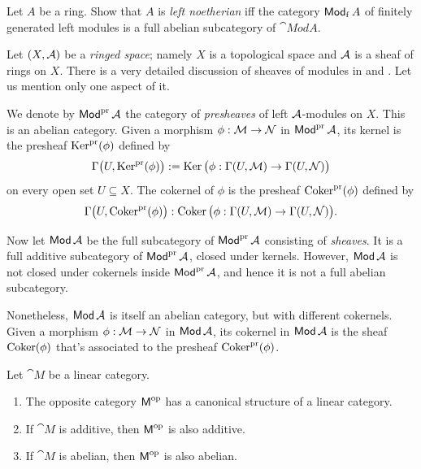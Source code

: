 \begin{exer}
Let $A$ be a ring. Show that $A$ is {\em left noetherian} iff the category 
$\operatorname{\mathsf{Mod}}_{\mathrm{f}} A$ of  finitely generated left modules is a full abelian 
subcategory of $\cat{Mod} A$. 
\end{exer}

\begin{exa} \label{exa:1}
Let $(X, \mathcal{A})$ be a {\em ringed space}; namely $X$ is a topological space 
and $\mathcal{A}$ is a sheaf of rings on $X$. 
There is a very detailed discussion of sheaves of modules in 
\cite[Section II.1]{Har} and \cite[Sections 2.1-2.2]{KaSc1}. 
Let us mention only one aspect of it. 

We denote by $\operatorname{\mathsf{Mod}}^{\mathrm{pr}} \mathcal{A}$ the category of {\em presheaves} 
of left $\mathcal{A}$-modules on $X$. This is an abelian category. 
Given a morphism $\phi : \mathcal{M} \to \mathcal{N}$ in 
$\operatorname{\mathsf{Mod}}^{\mathrm{pr}} \mathcal{A}$, its kernel is the presheaf 
$\operatorname{Ker}^{\mathrm{pr}}(\phi)$ defined by 
\[ \Gamma \bigl( U, \operatorname{Ker}^{\mathrm{pr}}(\phi) \bigr) := 
\operatorname{Ker} \big( \phi : \Gamma(U, \mathcal{M}) \to \Gamma(U, \mathcal{N}) \big)  \]
on every open set $U \subseteq X$. 
The cokernel of $\phi$ is the  presheaf $\operatorname{Coker}^{\mathrm{pr}}(\phi)$
defined by 
\[ \Gamma \bigl( U,  \operatorname{Coker}^{\mathrm{pr}}(\phi) \bigr) : 
\operatorname{Coker} \big( \phi : \Gamma(U, \mathcal{M}) \to \Gamma(U, \mathcal{N}) \big) . \]

Now let $\operatorname{\mathsf{Mod}} \mathcal{A}$ be the full subcategory of 
$\operatorname{\mathsf{Mod}}^{\mathrm{pr}} \mathcal{A}$ consisting of {\em sheaves}. 
It is a full additive subcategory of $\operatorname{\mathsf{Mod}}^{\mathrm{pr}} \mathcal{A}$, closed 
under kernels. However, $\operatorname{\mathsf{Mod}} \mathcal{A}$ is not closed under 
cokernels inside $\operatorname{\mathsf{Mod}}^{\mathrm{pr}} \mathcal{A}$,
and hence it is not a full abelian subcategory.

Nonetheless, $\operatorname{\mathsf{Mod}} \mathcal{A}$ is itself an abelian category, but
with different cokernels. Given a morphism 
$\phi : \mathcal{M} \to \mathcal{N}$ in $\operatorname{\mathsf{Mod}} \mathcal{A}$,
its cokernel in $\operatorname{\mathsf{Mod}} \mathcal{A}$ is the sheaf $\operatorname{Coker}(\phi)$ that's  
associated to the presheaf $\operatorname{Coker}^{\mathrm{pr}}(\phi)$.
\end{exa}

\begin{prop} \label{prop:2490}
Let $\cat{M}$ be a linear category.
\begin{enumerate}
\item The opposite category $\operatorname{\mathsf{M}}^{\mathrm{op}}$ has a canonical structure 
of a linear category. 

\item If $\cat{M}$ is additive, then $\operatorname{\mathsf{M}}^{\mathrm{op}}$ is also additive.

\item If $\cat{M}$ is abelian, then $\operatorname{\mathsf{M}}^{\mathrm{op}}$ is also abelian.
\end{enumerate}
\end{prop}

